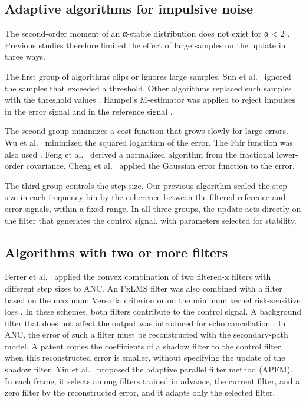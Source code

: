 \documentclass[sip,biber]{now-journal}
\begin{document}
\hypertarget{sec:2.1}{%
\subsection{Adaptive algorithms for impulsive noise}\label{sec:2.1}}

The second-order moment of an α-stable distribution does not exist for α \textless{} 2 \cite{shao1993}. Previous studies therefore limited the effect of large samples on the update in three ways.

The first group of algorithms clips or ignores large samples. Sun et al.~\cite{sun2006} ignored the samples that exceeded a threshold. Other algorithms replaced such samples with the threshold values \cite{akhtar2008,akhtar2009}. Hampel's M-estimator was applied to reject impulses in the error signal \cite{thanigai2007} and in the reference signal \cite{sun2015}.

The second group minimizes a cost function that grows slowly for large errors. Wu et al.~\cite{wu2011} minimized the squared logarithm of the error. The Fair function was also used \cite{wu2013}. Feng et al.~\cite{feng2024} derived a normalized algorithm from the fractional lower-order covariance. Cheng et al.~\cite{cheng2023} applied the Gaussian error function to the error.

The third group controls the step size. Our previous algorithm \cite{sugiura2026} scaled the step size in each frequency bin by the coherence between the filtered reference and error signals, within a fixed range. In all three groups, the update acts directly on the filter that generates the control signal, with parameters selected for stability.

\hypertarget{sec:2.2}{%
\subsection{Algorithms with two or more filters}\label{sec:2.2}}

Ferrer et al.~\cite{ferrer2013} applied the convex combination of two filtered-x filters with different step sizes to ANC. An FxLMS filter was also combined with a filter based on the maximum Versoria criterion \cite{cheng2022} or on the minimum kernel risk-sensitive loss \cite{yu2020}. In these schemes, both filters contribute to the control signal. A background filter that does not affect the output was introduced for echo cancellation \cite{ochiai1977}. In ANC, the error of such a filter must be reconstructed with the secondary-path model. A patent \cite{harman2022} copies the coefficients of a shadow filter to the control filter when this reconstructed error is smaller, without specifying the update of the shadow filter. Yin et al.~\cite{yin2023} proposed the adaptive parallel filter method (APFM). In each frame, it selects among filters trained in advance, the current filter, and a zero filter by the reconstructed error, and it adapts only the selected filter.
\end{document}

